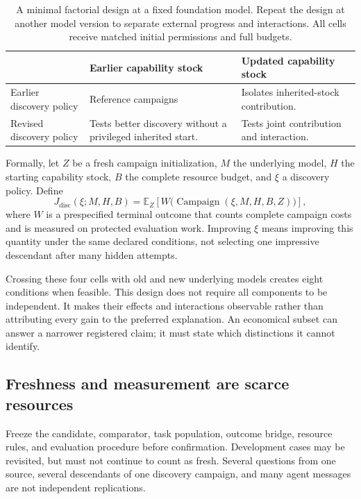 \documentclass[11pt,letterpaper]{article}
\newcommand{\E}{\mathbb{E}}
\theoremstyle{remark}\newtheorem{remark}{Remark}[section]
\begin{document}
\begin{table}[H]
\caption{A minimal factorial design at a fixed foundation model. Repeat the design at another model version to separate external progress and interactions. All cells receive matched initial permissions and full budgets.}\label{tab:factorial}
\small
\begin{tabularx}{\linewidth}{P{3.3cm}YY}
\toprule
&\textbf{Earlier capability stock}&\textbf{Updated capability stock}\\
\midrule
Earlier discovery policy & Reference campaigns & Isolates inherited-stock contribution.\\
Revised discovery policy & Tests better discovery without a privileged inherited start. & Tests joint contribution and interaction.\\
\bottomrule
\end{tabularx}
\end{table}

Formally, let $Z$ be a fresh campaign initialization, $M$ the underlying model, $H$ the starting capability stock, $B$ the complete resource budget, and $\xi$ a discovery policy. Define
\begin{equation}
J_{\mathrm{disc}}(\xi;M,H,B)=\E_Z\!\left[W\bigl(\operatorname{Campaign}(\xi,M,H,B,Z)\bigr)\right],
\label{eq:disc}
\end{equation}
where $W$ is a prespecified terminal outcome that counts complete campaign costs and is measured on protected evaluation work. Improving $\xi$ means improving this quantity under the same declared conditions, not selecting one impressive descendant after many hidden attempts.

Crossing these four cells with old and new underlying models creates eight conditions when feasible. This design does not require all components to be independent. It makes their effects and interactions observable rather than attributing every gain to the preferred explanation. An economical subset can answer a narrower registered claim; it must state which distinctions it cannot identify.

\subsection{Freshness and measurement are scarce resources}
Freeze the candidate, comparator, task population, outcome bridge, resource rules, and evaluation procedure before confirmation. Development cases may be revisited, but must not continue to count as fresh. Several questions from one source, several descendants of one discovery campaign, and many agent messages are not independent replications.
\end{document}
